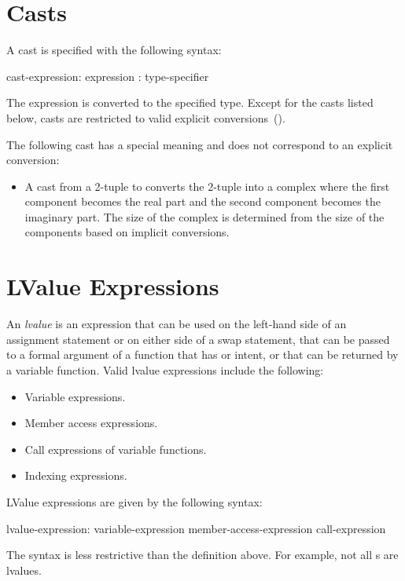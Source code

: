 \section{Casts}
\label{Casts}

A cast is specified with the following syntax:
\begin{syntax}
cast-expression:
  expression : type-specifier
\end{syntax}
The expression is converted to the specified type.  Except for the
casts listed below, casts are restricted to valid explicit
conversions~().

The following cast has a special meaning and does not correspond to an
explicit conversion:
\begin{itemize}
\item {}
  A cast from a 2-tuple to  converts the 2-tuple into a
  complex where the first component becomes the real part and the
  second component becomes the imaginary part.  The size of the
  complex is determined from the size of the components based on
  implicit conversions.
\end{itemize}

\section{LValue Expressions}
\label{lvalue}

An {\em lvalue} is an expression that can be used on the left-hand
side of an assignment statement or on either side of a swap statement,
that can be passed to a formal argument of a function that
has  or  intent, or that can be returned by a
variable function.  Valid lvalue expressions include the following:
\begin{itemize}
\item
 Variable expressions.
\item
 Member access expressions.
\item
 Call expressions of variable functions.
\item
 Indexing expressions.
\end{itemize}

LValue expressions are given by the following syntax:
\begin{syntax}
lvalue-expression:
  variable-expression
  member-access-expression
  call-expression
\end{syntax}
The syntax is less restrictive than the definition above.  For
example, not all s are lvalues.

